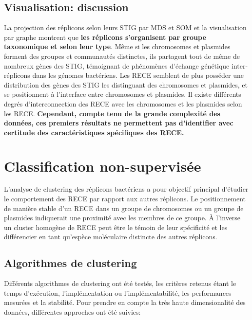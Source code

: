  
 
\subsection{Visualisation: discussion}

  La projection des réplicons selon leurs STIG par MDS et SOM et la visualisation par graphe montrent que \textbf{\color{orange}les réplicons s'organisent par groupe taxonomique et selon leur type}. Même si les chromosomes et plasmides forment des groupes et communautés distinctes, ils partagent tout de même de nombreux gènes des STIG, témoignant de phénomènes d'échange génétique inter-réplicons dans les génomes bactériens. Les RECE semblent de plus posséder une distribution des gènes des STIG les distinguant des chromosomes et plasmides, et se positionnent à l'interface entre chromosomes et plasmides. Il existe différents degrés d'interconnection des RECE avec les chromosomes et les plasmides selon les RECE. \textbf{Cependant, compte tenu de la grande complexité des données, ces premiers résultats ne permettent pas d'identifier avec certitude des caractéristiques spécifiques des RECE. }
  
  
  
\section{Classification non-supervisée}\label{parclassifnonsupervis}
      L'analyse de clustering des réplicons bactériens a pour objectif principal d'étudier le comportement des RECE par rapport aux autres réplicons. Le positionnement de manière stable d'un RECE dans un groupe de chromosomes ou un groupe de plasmides indiquerait une proximité avec les membres de ce groupe. À l'inverse un cluster homogène de RECE peut être le témoin de leur spécificité et les différencier en tant qu'espèce moléculaire distincte des autres réplicons. 
      
 \subsection{Algorithmes de clustering}\label{paralgoclust}
      
      Différents algorithmes de clustering ont été testés, les critères retenus étant le temps d'exécution, l'implémentation ou l'implémentabilité, les performances mesurées et la stabilité. Pour prendre en compte la très haute dimensionalité des données, différentes approches ont été suivies:
      
